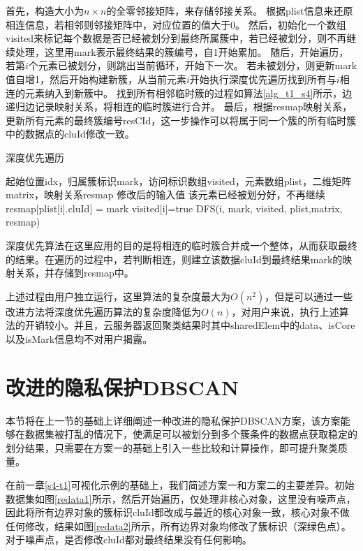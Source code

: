 首先，构造大小为$ n \times n $的全零邻接矩阵，来存储邻接关系。
根据plist信息来还原相连信息，若相邻则邻接矩阵中，对应位置的值大于0。
然后，初始化一个数组visited来标记每个数据是否已经被划分到最终所属簇中，若已经被划分，则不再继续处理，这里用mark表示最终结果的簇编号，自1开始累加。
随后，开始遍历，若第$ i $个元素已被划分，则跳出当前循环，开始下一次。
若未被划分，则更新mark值自增1，然后开始构建新簇，从当前元素$ i $开始执行深度优先遍历找到所有与$ i $相连的元素纳入到新簇中。
找到所有相邻临时簇的过程如算法\ref{alg_t1_s4}所示，边递归边记录映射关系，将相连的临时簇进行合并。
最后，根据resmap映射关系，更新所有元素的最终簇编号resCId，这一步操作可以将属于同一个簇的所有临时簇中的数据点的cluId修改一致。

\begin{algorithm}[htbp]
	\renewcommand{\algorithmicrequire}{\textbf{输入:}}
	\renewcommand{\algorithmicensure}{\textbf{输出:}}
	\caption{深度优先遍历}
	\label{alg_t1_s4}
	\begin{algorithmic}[1]
		\REQUIRE 起始位置idx，归属簇标识mark，访问标识数组visited，元素数组plist，二维矩阵matrix，映射关系resmap
		\ENSURE 修改后的输入值
		\STATE 该元素已经被划分好，不再继续
		\ENDIF
		\STATE resmap[plist[i].cluId] = mark
		\STATE visited[i]=true
		\STATE DFS(i, mark, visited, plist,matrix, resmap)
		\ENDIF
		\ENDFOR
	\end{algorithmic}
\end{algorithm}

深度优先算法在这里应用的目的是将相连的临时簇合并成一个整体，从而获取最终的结果。在遍历的过程中，若判断相连，则建立该数据cluId到最终结果mark的映射关系，并存储到resmap中。

上述过程由用户独立运行，这里算法的复杂度最大为$ O(n^2) $，但是可以通过一些改进方法将深度优先遍历算法的复杂度降低为$ O(n) $，对用户来说，执行上述算法的开销较小。并且，云服务器返回聚类结果时其中sharedElem中的data、isCore以及isMark信息均不对用户揭露。

\section{改进的隐私保护DBSCAN}
\label{s4-t2}
本节将在上一节的基础上详细阐述一种改进的隐私保护DBSCAN方案，该方案能够在数据集被打乱的情况下，使满足可以被划分到多个簇条件的数据点获取稳定的划分结果，只需要在方案一的基础上引入一些比较和计算操作，即可提升聚类质量。

在前一章\ref{s4-t1}可视化示例的基础上，我们简述方案一和方案二的主要差异。初始数据集如图\ref{redata1}所示，然后开始遍历，仅处理非核心对象，这里没有噪声点，因此将所有边界对象的簇标识cluId都改成与最近的核心对象一致，核心对象不做任何修改，结果如图\ref{redata2}所示，所有边界对象均修改了簇标识（深绿色点）。对于噪声点，是否修改cluId都对最终结果没有任何影响。

